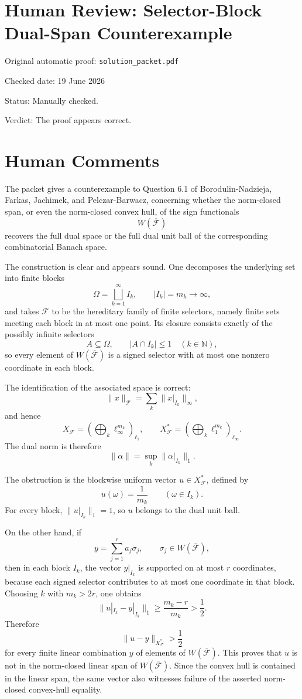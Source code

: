 ﻿\documentclass[11pt]{article}
\begin{document}
\section*{Human Review: Selector-Block Dual-Span Counterexample}

\noindent Original automatic proof: \texttt{solution\_packet.pdf}

\noindent Checked date: 19 June 2026

\noindent Status: Manually checked.

\noindent Verdict: The proof appears correct.

\section*{Human Comments}

The packet gives a counterexample to Question 6.1 of Borodulin-Nadzieja, Farkas, Jachimek, and Pelczar-Barwacz, concerning whether the norm-closed span, or even the norm-closed convex hull, of the sign functionals
\[
  W(\overline{\mathcal F})
\]
recovers the full dual space or the full dual unit ball of the corresponding combinatorial Banach space.

The construction is clear and appears sound.  One decomposes the underlying set into finite blocks
\[
  \Omega=\bigsqcup_{k=1}^\infty I_k,
  \qquad |I_k|=m_k\to\infty,
\]
and takes \(\mathcal F\) to be the hereditary family of finite selectors, namely finite sets meeting each block in at most one point.  Its closure consists exactly of the possibly infinite selectors
\[
  A\subseteq\Omega,
  \qquad |A\cap I_k|\leq 1\quad(k\in\mathbb N),
\]
so every element of \(W(\overline{\mathcal F})\) is a signed selector with at most one nonzero coordinate in each block.

The identification of the associated space is correct:
\[
  \|x\|_{\mathcal F}
  =\sum_k \|x|_{I_k}\|_\infty,
\]
and hence
\[
  X_{\mathcal F}
  =\left(\bigoplus_k \ell_\infty^{m_k}\right)_{\ell_1},
  \qquad
  X_{\mathcal F}^*
  =\left(\bigoplus_k \ell_1^{m_k}\right)_{\ell_\infty}.
\]
The dual norm is therefore
\[
  \|\alpha\|=\sup_k \|\alpha|_{I_k}\|_1.
\]

The obstruction is the blockwise uniform vector \(u\in X_{\mathcal F}^*\), defined by
\[
  u(\omega)=\frac1{m_k}\qquad(\omega\in I_k).
\]
For every block, \(\|u|_{I_k}\|_1=1\), so \(u\) belongs to the dual unit ball.

On the other hand, if
\[
  y=\sum_{j=1}^r a_j\sigma_j,
  \qquad \sigma_j\in W(\overline{\mathcal F}),
\]
then in each block \(I_k\), the vector \(y|_{I_k}\) is supported on at most \(r\) coordinates, because each signed selector contributes to at most one coordinate in that block.  Choosing \(k\) with \(m_k>2r\), one obtains
\[
  \|u|_{I_k}-y|_{I_k}\|_1
  \geq \frac{m_k-r}{m_k}
  >\frac12.
\]
Therefore
\[
  \|u-y\|_{X_{\mathcal F}^*}>\frac12
\]
for every finite linear combination \(y\) of elements of \(W(\overline{\mathcal F})\).  This proves that \(u\) is not in the norm-closed linear span of \(W(\overline{\mathcal F})\).  Since the convex hull is contained in the linear span, the same vector also witnesses failure of the asserted norm-closed convex-hull equality.
\end{document}
